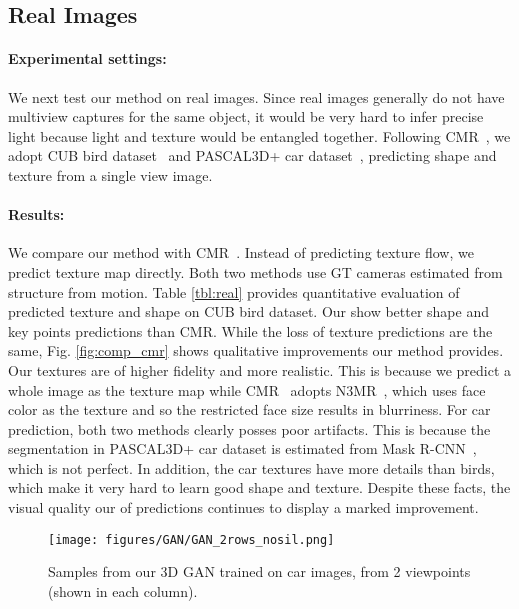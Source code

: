 \documentclass{article}
\begin{document}
\begin{minipage}[t] {0.09\textwidth}
\subsection{Real Images}
\vspace{-1.5mm}

\paragraph{Experimental settings:}  We next test our method on real images. Since real images generally do not have multiview captures for the same object, it would be very hard to infer precise light because light and texture would be entangled together. Following CMR~\cite{kanazawa2018learning}, we adopt CUB bird dataset~\cite{cub} and PASCAL3D+ car dataset~\cite{pascal3d}, predicting shape and texture from a single view image.

\vspace{-3mm}
\paragraph{Results:}
We compare our method with CMR~\cite{kanazawa2018learning}. Instead of predicting texture flow, we predict texture map directly. Both two methods use GT cameras estimated from structure from motion. Table \ref{tbl:real} provides quantitative evaluation of predicted texture and shape on CUB bird dataset. Our show better shape and key points predictions than CMR. While the loss of texture predictions are the same, Fig. \ref{fig:comp_cmr} shows qualitative improvements our method provides. Our textures are of higher fidelity and more realistic. This is because we predict a whole image as the texture map while CMR~\cite{kanazawa2018learning} adopts N3MR~\cite{NMR}, which uses face color as the texture and so the restricted face size results in blurriness. For car prediction, both two methods clearly posses poor artifacts. This is because the segmentation in PASCAL3D+ car dataset is estimated from Mask R-CNN~\cite{maskrcnn}, which is not perfect. In addition, the car textures have more details than birds, which make it very hard to learn good shape and texture. Despite these facts, the visual quality our of predictions continues to display a marked improvement. %
 

\begin{figure*}[t!]
\vspace{-0.5mm}
\centering
\texttt{[image: figures/GAN/GAN\_2rows\_nosil.png]}
\vspace{-6mm}
\caption{{\footnotesize Samples from our 3D GAN trained on car images, from 2 viewpoints (shown in each column).}}
\label{GAN_sample}
\vspace{-2mm}
\end{figure*}



\end{minipage}
\end{document}
